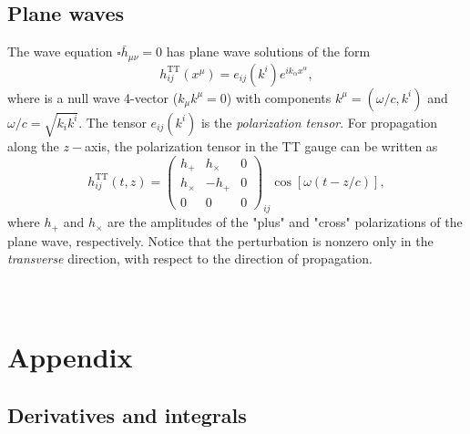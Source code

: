 \documentclass[12pt]{article}
\begin{document}
\subsection{Plane waves}

The wave equation $\square \bar h_{\mu\nu} =0$ has plane wave solutions of the form 
\begin{equation}
\boxed{h_{i j}^{\mathrm{TT}}(x^\mu)=e_{i j}({k^i}) e^{i k_\alpha x^\alpha}},
\end{equation}
where is a null wave 4-vector ($k_\mu k^\mu=0$) with components $k^\mu=(\omega/c,k^i)$ and $\omega/c = \sqrt{k_i k^i}$.
The tensor $e_{i j}({k^i})$ is the \textit{polarization tensor}. For propagation along the $z-$axis, the polarization tensor in the TT gauge can be written as 
\begin{equation}
h_{i j}^{\operatorname{TT}}(t, z)=\left(\begin{array}{ccc}{h_{+}} & {h_{\times}} & {0} \\ {h_{\times}} & {-h_{+}} & {0} \\ {0} & {0} & {0}\end{array}\right)_{i j} \cos [\omega(t-z / c)],
\end{equation}
where $h_+$ and  $h_\times$ are the amplitudes of the "plus" and "cross" polarizations of the plane wave, respectively. Notice that the perturbation is nonzero only in the \textit{transverse} direction, with respect to the direction of propagation.

\section*{\\ Appendix}

\subsection*{Derivatives and integrals}
\end{document}
